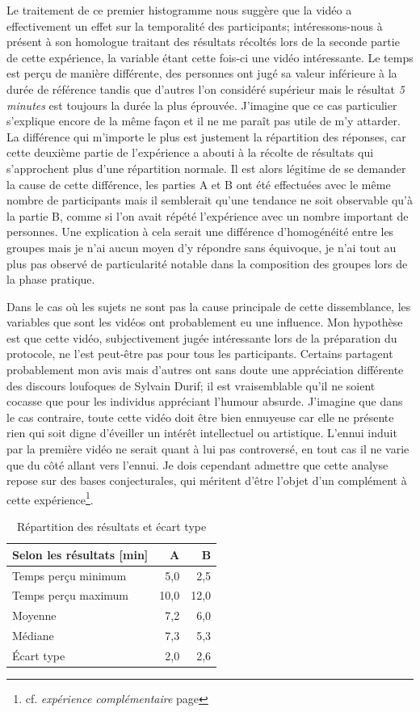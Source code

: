 \documentclass[12pt,fleqn,oneside,french,openany]{book} %
\begin{document}
Le traitement de ce premier histogramme nous suggère que la vidéo a effectivement un effet sur la temporalité des participants; intéressons-nous à présent à son homologue traitant des résultats récoltés lors de la seconde partie de cette expérience, la variable étant cette fois-ci une vidéo intéressante. Le temps est perçu de manière différente, des personnes ont jugé sa valeur inférieure à la durée de référence tandis que d'autres l'on considéré supérieur mais le résultat \emph{5 minutes} est toujours la durée la plus éprouvée. J'imagine que ce cas particulier s'explique encore de la même façon et il ne me paraît pas utile de m'y attarder. La différence qui m'importe le plus est justement la répartition des réponses, car cette deuxième partie de l'expérience a abouti à la récolte de résultats qui s'approchent plus d'une répartition normale. Il est alors légitime de se demander la cause de cette différence, les parties A et B ont été effectuées avec le même nombre de participants mais il semblerait qu'une tendance ne soit observable qu'à la partie B, comme si l'on avait répété l'expérience avec un nombre important de personnes. Une explication à cela serait une différence d'homogénéité entre les groupes mais je n'ai aucun moyen d'y répondre sans équivoque, je n'ai tout au plus pas observé de particularité notable dans la composition des groupes lors de la phase pratique. 

Dans le cas où les sujets ne sont pas la cause principale de cette dissemblance, les variables que sont les vidéos ont probablement eu une influence. Mon hypothèse est que cette vidéo, subjectivement jugée intéressante lors de la préparation du protocole, ne l'est peut-être pas pour tous les participants. Certains partagent probablement mon avis mais d'autres ont sans doute une appréciation différente des discours loufoques de Sylvain Durif; il est vraisemblable qu'il ne soient cocasse que pour les individus appréciant l'humour absurde. J'imagine que dans le cas contraire, toute cette vidéo doit être bien ennuyeuse car elle ne présente rien qui soit digne d'éveiller un intérêt intellectuel ou artistique. L'ennui induit par la première vidéo ne serait quant à lui pas controversé, en tout cas il ne varie que du côté allant vers l'ennui. Je dois cependant admettre que cette analyse repose sur des bases conjecturales, qui méritent d'être l'objet d'un complément à cette expérience\footnote{cf. \emph{expérience complémentaire} page \pageref{ssec:exp1.2}}. 

\begin{table}[h!]
	\centering
	\caption{Répartition des résultats et écart type} \label{tbl:analyse1.1}
	\begin{tabular}{lrr}
		\toprule 
		\textbf{Selon les résultats [min]} & \textbf{A} & \textbf{B} \\ \midrule
		Temps perçu minimum & 5,0 & 2,5 \\ 
		Temps perçu maximum & 10,0 & 12,0 \\
		Moyenne & 7,2 & 6,0 \\
		Médiane & 7,3 & 5,3 \\
		Écart type & 2,0 & 2,6 \\ \bottomrule
	\end{tabular}
\end{table}
\end{document}
